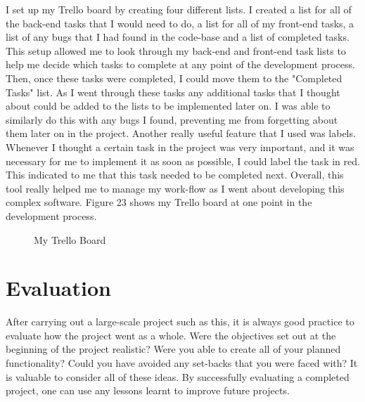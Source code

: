 I set up my Trello board by creating four different lists. I created a list for all of the back-end tasks that I would need to do, a list for all of my front-end tasks, a list of any bugs that I had found in the code-base and a list of completed tasks. This setup allowed me to look through my back-end and front-end task lists to help me decide which tasks to complete at any point of the development process. Then, once these tasks were completed, I could move them to the "Completed Tasks" list. As I went through these tasks any additional tasks that I thought about could be added to the lists to be implemented later on. I was able to similarly do this with any bugs I found, preventing me from forgetting about them later on in the project. Another really useful feature that I used was labels. Whenever I thought a certain task in the project was very important, and it was necessary for me to implement it as soon as possible, I could label the task in red. This indicated to me that this task needed to be completed next. Overall, this tool really helped me to manage my work-flow as I went about developing this complex software. Figure 23 shows my Trello board at one point in the development process.

\begin{figure}[!ht]
	\centering
	\caption{My Trello Board}
\end{figure}

\pagebreak

\section{Evaluation}

After carrying out a large-scale project such as this, it is always good practice to evaluate how the project went as a whole. Were the objectives set out at the beginning of the project realistic? Were you able to create all of your planned functionality? Could you have avoided any set-backs that you were faced with? It is valuable to consider all of these ideas. By successfully evaluating a completed project, one can use any lessons learnt to improve future projects.

